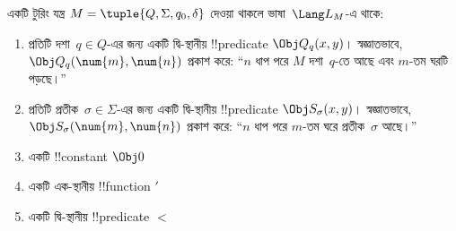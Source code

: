 \documentclass[../../../include/open-logic-section]{subfiles}
\begin{document}
\begin{defn}
একটি টুরিং যন্ত্র $M = \tuple{Q, \Sigma, q_0, \delta}$ দেওয়া থাকলে
ভাষা~$\Lang L_M$-এ থাকে:
\begin{enumerate}
\item প্রতিটি দশা~$q \in Q$-এর জন্য একটি দ্বি-স্থানীয় !!{predicate}
  $\Obj Q_q(x,y)$। স্বজ্ঞাতভাবে, $\Obj Q_q(\num{m},\num{n})$ প্রকাশ করে:
  “$n$ ধাপ পরে $M$ দশা~$q$-তে আছে এবং $m$-তম ঘরটি পড়ছে।”
\item প্রতিটি প্রতীক~$\sigma\in\Sigma$-এর জন্য একটি দ্বি-স্থানীয়
  !!{predicate} $\Obj S_\sigma(x,y)$। স্বজ্ঞাতভাবে,
  $\Obj S_\sigma(\num{m},\num{n})$ প্রকাশ করে: “$n$ ধাপ পরে $m$-তম ঘরে
  প্রতীক~$\sigma$ আছে।”
\item একটি !!{constant} $\Obj 0$
\item একটি এক-স্থানীয় !!{function} $\prime$
\item একটি দ্বি-স্থানীয় !!{predicate} $<$
\end{enumerate}
\end{defn}
\end{document}

